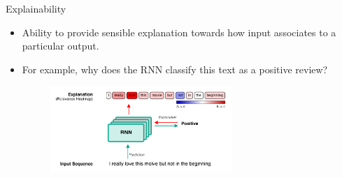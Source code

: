\documentclass[Nike]{tuberlinbeamer}
\begin{document}
\begin{frame}{Explainability}
\begin{itemize}
	\item Ability to provide sensible explanation towards how input associates to a particular output.
	\item For example, why does the RNN classify this text as a positive review?

	\begin{figure}[h]
		\includegraphics [width=0.65\textwidth]{figures/present_explanation_rnn}
	\end{figure}
	
%
\end{itemize}
	
\end{frame}
\end{document}
